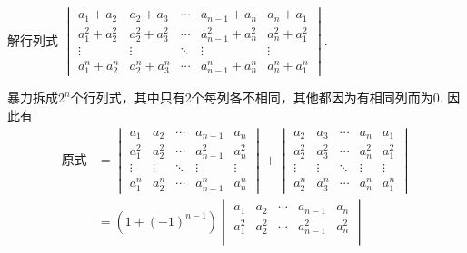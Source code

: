 \begin{exercise}
\begin{exgroup}
        \item 解行列式 $\begin{vmatrix}
                a_{1}+a_{2}         & a_{2}+a_{3}         & \cdots & a_{n-1}+a_n         & a_n+a_{1}         \\
                a_{1}^{2}+a_{2}^{2} & a_{2}^{2}+a_{3}^{2} & \cdots & a_{n-1}^{2}+a_n^{2} & a_n^{2}+a_{1}^{2} \\
                \vdots              & \vdots              & \ddots & \vdots              & \vdots            \\
                a_{1}^{n}+a_{2}^{n} & a_{2}^{n}+a_{3}^{n} & \cdots & a_{n-1}^{n}+a_n^{n} & a_n^{n}+a_{1}^{n}
            \end{vmatrix}$.
        \begin{answer}
            暴力拆成$2^n$个行列式，其中只有2个每列各不相同，其他都因为有相同列而为0. 因此有
            \begin{align*}
                \text{原式} & =\begin{vmatrix}
                                    a_{1}     & a_{2}     & \cdots & a_{n-1}     & a_{n}     \\
                                    a_{1}^{2} & a_{2}^{2} & \cdots & a_{n-1}^{2} & a_{n}^{2} \\
                                    \vdots    & \vdots    & \ddots & \vdots      & \vdots    \\
                                    a_{1}^{n} & a_{2}^{n} & \cdots & a_{n-1}^{n} & a_{n}^{n}
                                \end{vmatrix}+
                \begin{vmatrix}
                    a_{2}     & a_{3}     & \cdots & a_{n}     & a_{1}     \\
                    a_{2}^{2} & a_{3}^{2} & \cdots & a_{n}^{2} & a_{1}^{2} \\
                    \vdots    & \vdots    & \ddots & \vdots    & \vdots    \\
                    a_{2}^{n} & a_{3}^{n} & \cdots & a_{n}^{n} & a_{1}^{n}
                \end{vmatrix}                                               \\
                            & =(1+(-1)^{n-1})\begin{vmatrix}
                                                a_{1}     & a_{2}     & \cdots & a_{n-1}     & a_{n}     \\
                                                a_{1}^{2} & a_{2}^{2} & \cdots & a_{n-1}^{2} & a_{n}^{2} \\

\end{vmatrix}
\end{align*}
\end{answer}
\end{exgroup}
\end{exercise}
